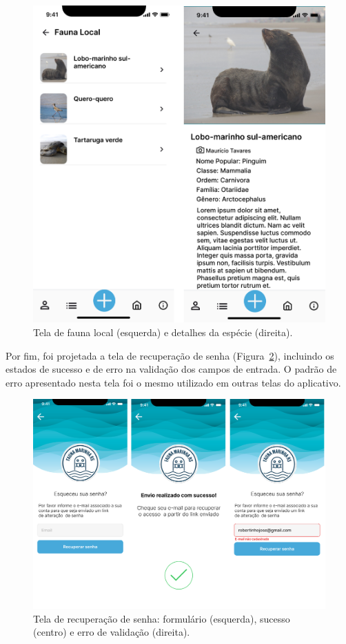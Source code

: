 \begin{figure}[H]
    \centering
    \includegraphics[height=0.6\textheight]{imagens/fauna-local-figma.png}
    \caption{Tela de fauna local (esquerda) e detalhes da espécie (direita).}
    \label{fig:prototipo-fauna-local}
\end{figure}

Por fim, foi projetada a tela de recuperação de senha (Figura~\ref{fig:prototipo-esqueci-senha}), 
incluindo os estados de sucesso e de erro na validação dos campos de entrada. O padrão de erro 
apresentado nesta tela foi o mesmo utilizado em outras telas do aplicativo.

\begin{figure}[H]
    \centering
    \includegraphics[height=0.53\textheight, width=\textwidth]{imagens/esqueceu-senha-figma.png}
    \caption{Tela de recuperação de senha: formulário (esquerda), sucesso (centro) e erro de 
    validação (direita).}
    \label{fig:prototipo-esqueci-senha}
\end{figure}

